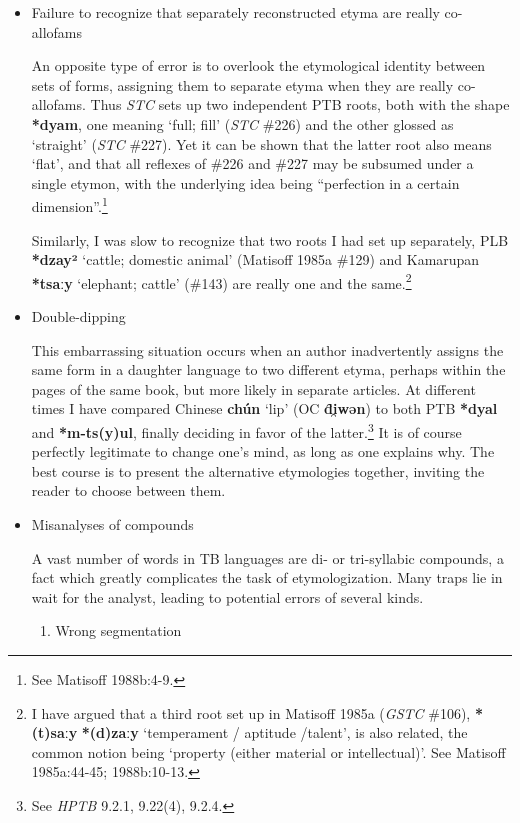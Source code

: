 \begin{itemize}
\item Failure to recognize that separately reconstructed etyma are really co-allofams

An opposite type of error is to overlook the etymological identity between sets
of forms, assigning them to separate etyma when they are really co-allofams.
Thus \textit{STC} sets up two independent PTB roots, both with the shape \textbf{*dyam}, one
meaning ‘full; fill’ (\textit{STC} \#226) and the other glossed as ‘straight’ (\textit{STC} \#227).
Yet it can be shown that the latter root also means ‘flat’, and that all
reflexes of \#226 and \#227 may be subsumed under a single etymon, with the
underlying idea being “perfection in a certain dimension”.\footnote{See Matisoff
1988b:4-9.}


Similarly, I was slow to recognize that two roots I had set up separately,
PLB \textbf{*dzay²} ‘cattle; domestic animal’ (Matisoff 1985a \#129)
and Kamarupan \textbf{*tsaːy} ‘elephant;
cattle’ (\#143) are really one and the same.\footnote{I have argued that a
third root set up in Matisoff 1985a (\textit{GSTC} \#106), \textbf{*(t)saːy}  \textbf{*(d)zaːy} ‘temperament / aptitude
/talent’, is also related, the common notion being ‘property (either material or
intellectual)’. See Matisoff 1985a:44-45; 1988b:10-13.}

\item Double-dipping

This embarrassing situation occurs when an author inadvertently assigns the same
form in a daughter language to two different etyma, perhaps within the pages of
the same book, but more likely in separate articles. At different times I have
compared Chinese \textbf{chún}  ‘lip’ (OC \textbf{d̑i̯wən}) to both PTB \textbf{*dyal}
and \textbf{*m-ts(y)ul}, finally deciding in favor of the latter.\footnote{See \textit{HPTB}
9.2.1, 9.22(4), 9.2.4.}  It
is of course perfectly legitimate to change one’s mind, as long as one explains
why. The best course is to present the alternative etymologies together,
inviting the reader to choose between them.

\item Misanalyses of compounds

A vast number of words in TB languages are di- or tri-syllabic compounds, a fact
which greatly complicates the task of etymologization.  Many traps lie in wait
for the analyst, leading to potential errors of several kinds.

\begin{enumerate}
\item Wrong segmentation


\end{enumerate}
\end{itemize}
